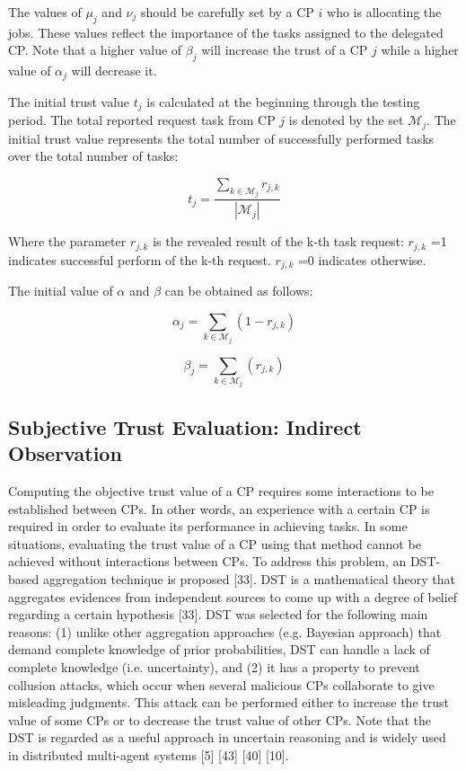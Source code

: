 \documentclass[preprint]{elsarticle}
\theoremstyle{definition}
\theoremstyle{remark}
\theoremstyle{property}
\begin{document}
The values of $\mu_{j}$ and $\nu_{j}$ should be carefully set by a CP $i$ who is allocating the jobs. These values reflect the importance of the tasks assigned to the delegated CP. Note that a higher value of $\beta_{j}$ will increase the trust of a CP $j$ while a higher value of $\alpha_{j}$ will decrease it.

The initial trust value $t_{j}$ is calculated at the beginning through the testing period. The total reported request task from  CP $j$ is denoted by the set $\mathcal{M}_{j}$. The initial trust value represents the total number of successfully performed tasks over the total number of tasks:

\begin{equation}
t_{j}=\frac{\sum_{k \in \mathcal{M}_{j}} r_{j,k}}{|\mathcal{M}_{j}|}
\end{equation}

Where the parameter $r_{j,k}$ is the revealed result of the k-th task request: $r_{j,k}$ =1 indicates successful perform of the k-th request. $r_{j,k}$ =0 indicates otherwise.

The initial value of $\alpha$ and $\beta$ can be obtained as follows:

\begin{equation}
\alpha_{j}=\sum_{k \in \mathcal{M}_{j}} (1 - r_{j,k})
\end{equation}

\begin{equation}
\beta_{j}=\sum_{k \in \mathcal{M}_{j}} (r_{j,k})
\end{equation}

\subsection{Subjective Trust Evaluation: Indirect Observation}
Computing the objective trust value of a CP requires some interactions to be established
between CPs. In other words, an experience with a certain CP is required in order to evaluate
its performance in achieving tasks. In some situations, evaluating the trust value of
a CP using that method cannot be achieved without interactions between
CPs. To address this problem, an DST-based aggregation technique is proposed [33].
DST is a mathematical theory that aggregates evidences from independent sources to
come up with a degree of belief regarding a certain hypothesis [33]. DST was selected
for the following main reasons: (1) unlike other aggregation approaches (e.g. Bayesian
approach) that demand complete knowledge of prior probabilities, DST can handle a
lack of complete knowledge (i.e. uncertainty), and (2) it has a property to prevent collusion
attacks, which occur when several malicious CPs collaborate to give misleading
judgments. This attack can be performed either to increase the trust value of some CPs
or to decrease the trust value of other CPs. Note that the DST is regarded as a useful
approach in uncertain reasoning and is widely used in distributed multi-agent systems
[5] [43] [40] [10].
\end{document}
